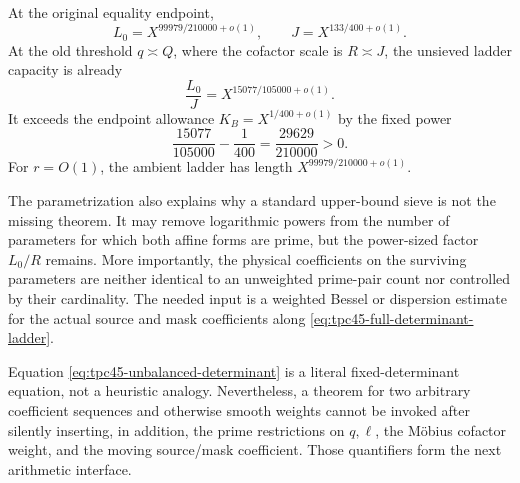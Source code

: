 At the original equality endpoint,
\begin{equation}
 L_0=X^{99979/210000+o(1)},
 \qquad
 J=X^{133/400+o(1)}.
 \label{eq:tpc45-L-J-scales}
\end{equation}
At the old threshold \(q\asymp Q\), where the cofactor scale is
\(R\asymp J\), the unsieved ladder capacity is already
\begin{equation}
 \frac{L_0}{J}
 =X^{15077/105000+o(1)}.
 \label{eq:tpc45-best-unbalanced-capacity}
\end{equation}
It exceeds the endpoint allowance \(K_B=X^{1/400+o(1)}\) by the fixed
power
\begin{equation}
 \frac{15077}{105000}-\frac1{400}
 =\frac{29629}{210000}>0.
 \label{eq:tpc45-best-capacity-deficit}
\end{equation}
For \(r=O(1)\), the ambient ladder has length
\(X^{99979/210000+o(1)}\).

The parametrization also explains why a standard upper-bound sieve is
not the missing theorem.  It may remove logarithmic powers from the
number of parameters for which both affine forms are prime, but the
power-sized factor \(L_0/R\) remains.  More importantly, the physical
coefficients on the surviving parameters are neither identical to an
unweighted prime-pair count nor controlled by their cardinality.  The
needed input is a weighted Bessel or dispersion estimate for the actual
source and mask coefficients along
\eqref{eq:tpc45-full-determinant-ladder}.

Equation \eqref{eq:tpc45-unbalanced-determinant} is a literal
fixed-determinant equation, not a heuristic analogy.  Nevertheless, a
theorem for two arbitrary coefficient sequences and otherwise smooth
weights cannot be invoked after silently inserting, in addition, the
prime restrictions on \(q,\ell\), the M\"obius cofactor weight, and the
moving source/mask coefficient.  Those quantifiers form the next
arithmetic interface.
